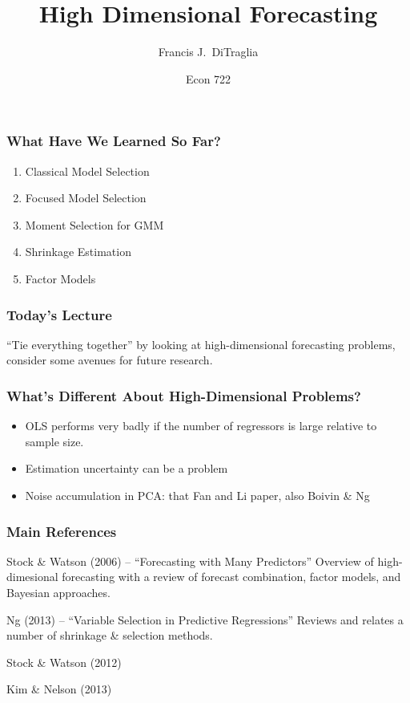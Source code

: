 \documentclass[handout]{beamer}
\title[Econ 722]{High Dimensional Forecasting}
\author[F. DiTraglia]{Francis J.\ DiTraglia}
\institute{University of Pennsylvania}
\date{Econ 722}
\begin{document}
 



\begin{frame}[plain]
	\titlepage 
	

\end{frame} 
\begin{frame}[c]\frametitle{What Have We Learned So Far?}
    
    \begin{enumerate}
    	\item Classical Model Selection
    	\item Focused Model Selection
    	\item Moment Selection for GMM
    	\item Shrinkage Estimation
    	\item Factor Models
    \end{enumerate}

\end{frame}
\begin{frame}[c]\frametitle{Today's Lecture}
    
``Tie everything together'' by looking at high-dimensional forecasting problems, consider some avenues for future research.

\end{frame}

\begin{frame}[c]\frametitle{What's Different About High-Dimensional Problems?}
    
\begin{itemize}
	\item OLS performs very badly if the number of regressors is large relative to sample size.
	\item Estimation uncertainty can be a problem
	\item Noise accumulation in PCA: that Fan and Li paper, also Boivin \& Ng
\end{itemize}

\end{frame}
\begin{frame}
	\frametitle{Main References}
	\begin{block}
		{Stock \& Watson (2006) -- ``Forecasting with Many Predictors''} Overview of high-dimesional forecasting with a review of forecast combination, factor models, and Bayesian approaches.
	\end{block}
	\begin{block}
		{Ng (2013) -- ``Variable Selection in Predictive Regressions''}
		Reviews and relates a number of shrinkage \& selection methods.
	\end{block}
	\begin{block}
		{Stock \& Watson (2012)}
	\end{block}
	\begin{block}
		{Kim \& Nelson (2013)}
	\end{block}
\end{frame}
\end{document}

